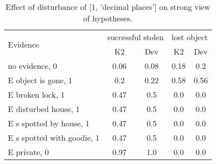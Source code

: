 \begin{table}\begin{tabular}{l|cc|cc}\toprule\multirow{2}{*}{Evidence} & \multicolumn{2}{c}{successful stolen}& \multicolumn{2}{c}{lost object}\\& {K2} & {Dev}& {K2} & {Dev}\\\midrule
no evidence, 0 & 0.06&0.08&0.18&0.2\\E object is gone, 1 & 0.2&0.22&0.58&0.56\\E broken lock, 1 & 0.47&0.5&0.0&0.0\\E disturbed house, 1 & 0.47&0.5&0.0&0.0\\E s spotted by house, 1 & 0.47&0.5&0.0&0.0\\E s spotted with goodie, 1 & 0.47&0.5&0.0&0.0\\E private, 0 & 0.97&1.0&0.0&0.0\\\bottomrule\end{tabular}\caption{Effect of disturbance of [1, 'decimal places'] on strong view of hypotheses.}\end{table}